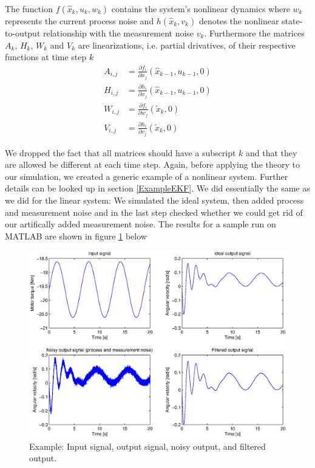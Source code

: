 The function \(f(\hat{x}_k,u_k,w_k)\) contains the system's nonlinear dynamics where \(w_k\) represents the current process noise and \(h(\hat{x}_k, v_k)\) denotes the nonlinear state-to-output relationship with the measurement noise \(v_k\). Furthermore the matrices \(A_k\), \(H_k\), \(W_k\) and \(V_k\) are linearizations, i.e. partial drivatives, of their respective functions at time step \(k\)
\newline
	\begin{eqnarray}\label{Linearizations}
    			A_{i,j}&= \frac{\partial f_i}{\partial x_j}(\hat{x}_{k-1},u_{k-1},0) \\
    			H_{i,j}&= \frac{\partial h_i}{\partial x_j}(\hat{x}_{k-1},u_{k-1},0) \\
			W_{i,j}&= \frac{\partial f_i}{\partial w_j}(\tilde{x}_k,0) \\
			V_{i,j}&= \frac{\partial h_i}{\partial v_j}(\tilde{x}_k,0)
	\end{eqnarray}

We dropped the fact that all matrices should have a subscript \(k\) and that they are allowed be different at each time step. Again, before applying the theory to our simulation, we created a generic example of a nonlinear system. Further details can be looked up in section \ref{ExampleEKF}. We did essentially the same as we did for the linear system: We simulated the ideal system, then added process and measurement noise and in the last step checked whether we could get rid of our artifically added measurement noise. The results for a sample run on MATLAB are shown in figure \ref{EKFchart} below

\begin{figure}[htbp]
	\centering
    	\includegraphics[width=12cm]{./3_KalmanFilterTheory/EKFchart.eps}
  	\caption{Example: Input signal, output signal, noisy output, and filtered output.}
  	\label{EKFchart}
\end{figure}


